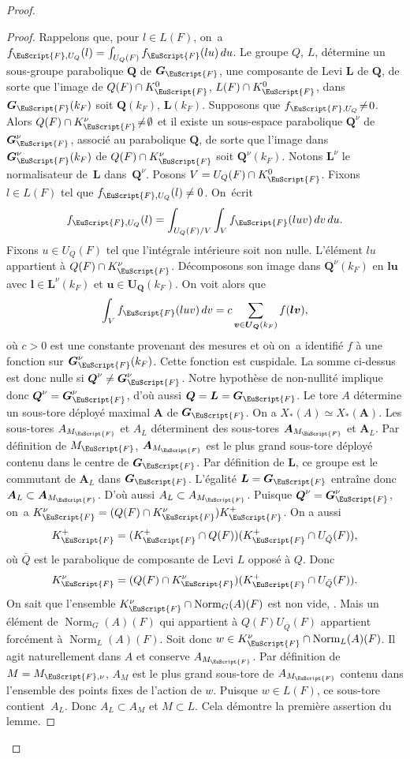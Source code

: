 \documentclass[JEP,XML,SOM,Unicode,francais]{cedram}
\let\mathcal \EuScript
\DeclareMathOperator{\Norm}{Norm}
\newcommand{\bmu}{\boldsymbol{u}}
\newcommand{\bmv}{\boldsymbol{v}}
\newcommand{\bA}{\boldsymbol{A}}
\newcommand{\bG}{\boldsymbol{G}}
\newcommand{\bl}{\boldsymbol{l}}
\newcommand{\bL}{\boldsymbol{L}}
\newcommand{\bQ}{\boldsymbol{Q}}
\newcommand{\bU}{\boldsymbol{U}}
\newcommand{\cF}{\mathcal{F}}
\theoremstyle{plain}
\theoremstyle{definition}
\begin{document}
\begin{proof}
\begin{proof}
Rappelons que, pour $l\in L(F)$, on~a $f_{\cF,U_{Q}}(l)=\int_{U_{Q}(F)}f_{\cF}(lu)\,du$. Le groupe $Q$, \resp $L$, détermine un sous-groupe parabolique $\bQ$ de $\bG_{\cF}$, \resp une composante de Levi $\bL$ de $\bQ$, de sorte que l'image de $Q(F)\cap K_{\cF}^0$, \resp $L(F)\cap K_{\cF}^0$, dans~$\bG_{\cF}(k_{F})$ soit $\bQ(k_{F})$, \resp $\bL(k_{F})$. Supposons que $f_{\cF,U_{Q}}\!\neq\!0$. Alors $Q(F)\cap K_{\cF}^{\nu}\!\neq\!\emptyset$ et il existe un sous-espace parabolique $\bQ^{\nu}$ de $\bG^{\nu}_{\cF}$, associé au parabolique $\bQ$, de sorte que l'image dans $\bG^{\nu}_{\cF}(k_{F})$ de $Q(F)\cap K_{\cF}^{\nu}$ soit $\bQ^{\nu}(k_{F})$. Notons $\bL^{\nu}$ le normalisateur de~$\bL$ dans~$\bQ^{\nu}$. Posons $V=U_{Q}(F)\cap K_{\cF}^0$. Fixons $l\in L(F)$ tel que $f_{\cF,U_{Q}}(l)\neq0$. On~écrit
\[
f_{\cF,U_{Q}}(l)=\int_{U_{Q}(F)/V}\int_{V}f_{\cF}(luv)\,dv\,du.
\]
Fixons $u\in U_{Q}(F)$ tel que l'intégrale intérieure soit non nulle. L'élément $lu$ appartient à $Q(F)\cap K_{\cF}^{\nu}$. Décomposons son image dans $\bQ^{\nu}(k_{F})$ en $\bl\bmu$ avec $\bl\in \bL^{\nu}(k_{F})$ et $\bmu\in \bU_{\bQ}(k_{F})$. On voit alors que
\[
\int_{V}f_{\cF}(luv)\,dv=c\sum_{\bmv\in \bU_{\bQ}(k_{F})}f(\bl\bmv),
\]
où $c>0$ est une constante provenant des mesures et où on~a identifié $f$ à une fonction sur $\bG^{\nu}_{\cF}(k_{F})$. Cette fonction est cuspidale. La somme ci-dessus est donc nulle si $\bQ^{\nu}\neq\bG_{\cF}^{\nu}$. Notre hypothèse de non-nullité implique donc $\bQ^{\nu}=\bG_{\cF}^{\nu}$, d'où aussi $\bQ=\bL=\bG_{\cF}$. Le tore $A$ détermine un sous-tore déployé maximal $\bA$ de $\bG_{\cF}$. On a $X_{*}(A)\simeq X_{*}(\bA)$. Les sous-tores $A_{M_{\cF}}$ et $A_{L}$ déterminent des sous-tores $\bA_{M_{\cF}}$ et $\bA_{L}$. Par définition de $M_{\cF}$, $\bA_{M_{\cF}}$ est le plus grand sous-tore déployé contenu dans le centre de $\bG_{\cF}$. Par définition de $\bL$, ce groupe est le commutant de $\bA_{L}$ dans $\bG_{\cF}$. L'égalité $\bL=\bG_{\cF}$ entraîne donc $\bA_{L}\subset \bA_{M_\cF}$. D'où aussi $A_{L}\subset A_{M_{\cF}}$. Puisque $\bQ^{\nu}=\bG_{\cF}^{\nu}$, on~a $K_{\cF}^{\nu}=(Q(F)\cap K_{\cF}^{\nu})K_{\cF}^+$. On a aussi
\[
K_{\cF}^+=(K_{\cF}^+\cap Q(F))(K_{\cF}^+\cap U_{\bar{Q}}(F)),
\]
où $\bar{Q}$ est le parabolique de composante de Levi $L$ opposé à $Q$. Donc
\[
K_{\cF}^{\nu}=(Q(F)\cap K_{\cF}^{\nu})(K_{\cF}^+\cap U_{\bar{Q}}(F)).
\]
On sait que l'ensemble $K_{\cF}^{\nu}\cap \Norm_{G}(A)(F)$ est non vide, \cf \cite[7.4.4]{BT}. Mais un élément de $\Norm_{G}(A)(F)$ qui appartient à $Q(F)U_{\bar{Q}}(F)$ appartient forcément à $\Norm_{L}(A)(F)$. Soit donc $w\in K_{\cF}^{\nu}\cap \Norm_{L}(A)(F)$. Il agit naturellement dans $A$ et conserve $A_{M_{\cF}}$. Par définition de $M=M_{\cF,\nu}$, $A_{M}$ est le plus grand sous-tore de $A_{M_{\cF}}$ contenu dans l'ensemble des points fixes de l'action de $w$. Puisque $w\in L(F)$, ce sous-tore contient~$A_{L}$. Donc $A_{L}\subset A_{M}$ et $M\subset L$. Cela démontre la première assertion du lemme.


\end{proof}
\end{proof}
\end{document}
